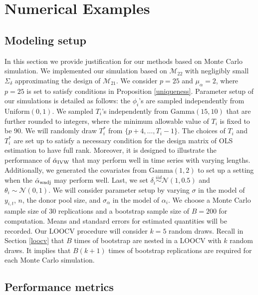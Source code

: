 \documentclass[11pt]{article}
\newcommand{\simiid}{\stackrel{iid}{\sim}} %
\def\mrm#1{\mathrm{#1}} %
\def\normal#1#2{\mathcal{N}(#1,#2)} %
\def\mc#1{\mathcal{#1}} %
\theoremstyle{definition}
\begin{document}
\section{Numerical Examples}
\label{simulation}

\subsection{Modeling setup}

In this section we provide justification for our methods based on Monte Carlo simulation. We implemented our simulation based on $\mc{M}_{22}$ with negligibly small $\Sigma_{\delta}$ approximating the design of $\mathcal{M}_{21}$.  We consider $p=25$ and $\mu_{\alpha}=2$, where $p = 25$ is set to satisfy conditions in Proposition \ref{uniqueness}. Parameter setup of our simulations is detailed as follows: the $\phi_i$'s are sampled independently from $\mrm{Uniform}(0,1)$. We sampled $T_i$'s independently from  $\text{Gamma}(15, 10)$ that are further rounded to integers, where the minimum allowable value of $T_i$ is fixed to be 90. We will randomly draw $T_i^*$ from $\{p + 4, \ldots, T_i-1\}$. The choices of $T_i$ and $T_i^*$ are set up to satisfy a necessary condition for the design matrix of OLS estimation to have full rank. Moreover, it is  designed to illustrate the performance of $\hat{\alpha}_{\rm IVW}$ that may perform well in time series with varying lengths. Additionally, we generated the covariates from $\text{Gamma}(1,2)$ to set up a setting when the $\hat{\alpha}_{\rm wadj}$ may perform well. Last, we set $\delta_i\simiid  \normal{1}{0.5}$ and $\theta_i \sim \normal{0}{1}$. We will consider parameter setup by varying $\sigma$ in the model of $y_{i,t}$, $n$, the donor pool size, and $\sigma_{\alpha}$ in the model of $\alpha_i$. We choose a Monte Carlo sample size of $30$ replications and a bootstrap sample size of $B = 200$ for computation. Means and standard errors for estimated quantities will be recorded. Our LOOCV procedure will consider $k=5$ random draws. Recall in Section \ref{loocv} that $B$ times of bootstrap are nested in a LOOCV with $k$ random draws. It implies that $B(k+1)$ times of bootstrap replications are required for each Monte Carlo simulation.


\subsection{Performance metrics}
\end{document}
